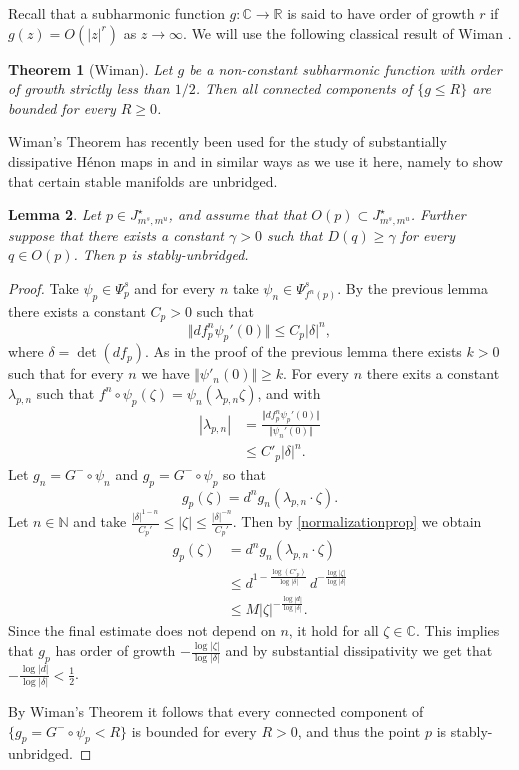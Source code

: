 \documentclass[10pt,a4paper]{article}
\newtheorem{theorem}{Theorem}[section]
\newtheorem{lemma}[theorem]{Lemma}
\begin{document}
Recall that a subharmonic function $g:\mathbb C\rightarrow \mathbb R$ is said to have order of growth $r$ if $g(z)=O(|z|^r)$ as $z\to\infty$. We will use the following classical result of Wiman \cite{Wi}.

\begin{theorem}[Wiman]
Let $g$ be a non-constant subharmonic function with order of growth strictly less than $1/2$. Then all connected components of $\{g\leq R\}$ are bounded for every $R\geq 0$.
\end{theorem}

Wiman's Theorem has recently been used for the study of substantially dissipative H\'enon maps in \cite{DL} and \cite{LP} in similar ways as we use it here, namely to show that certain stable manifolds are unbridged.

\begin{lemma}
\label{boundedangles}
Let $p\in J^\star_{m^s,m^u}$, and assume that that $O(p)\subset J^\star_{m^s,m^u}$. Further suppose that there exists a constant $\gamma>0$ such that $D(q)\geq \gamma$ for every $q\in O(p)$. Then $p$ is stably-unbridged.
\end{lemma}
\begin{proof}
Take $\psi_p\in\Psi^s_p$ and for every $n$ take $\psi_n\in\Psi^s_{f^n(p)}$. By the previous lemma there exists a constant $C_p>0$ such that
\[
\Vert df^n_p\psi_p'(0)\Vert\leq C_p|\delta|^n,
\]
where $\delta=\det(df_p)$. As in the proof of the previous lemma there exists $k>0$ such that for every $n$ we have $\Vert \psi'_n(0)\Vert\geq k$. For every $n$ there exits a constant $\lambda_{p,n}$ such that $f^n\circ \psi_p(\zeta)=\psi_n(\lambda_{p,n}\zeta)$, and with
\begin{align*}
|\lambda_{p,n}|&=\frac{\Vert df^n_p\psi_p'(0)\Vert}{\Vert \psi_n'(0)\Vert}\\
&\leq C'_p|\delta|^n.
\end{align*}
Let $g_n=G^-\circ\psi_n$ and $g_p=G^-\circ\psi_p$ so that
\[
g_p(\zeta)=d^ng_n(\lambda_{p,n}\cdot \zeta).
\]
Let $n\in\mathbb N$ and take $\frac{|\delta|^{1-n}}{C_p'}\leq|\zeta|\leq \frac{|\delta|^{-n}}{C_p'}$. Then by \eqref{normalizationprop} we obtain
\begin{align*}
g_p(\zeta)&=d^ng_n(\lambda_{p,n}\cdot \zeta)\\
&\leq d^{1-\frac{\log(C'_p)}{\log|\delta|}}\,d^{-\frac{\log|\zeta|}{\log|\delta|}}\\
&\leq M|\zeta|^{-\frac{\log|d|}{\log|\delta|}}.
\end{align*}
Since the final estimate does not depend on $n$, it hold for all $\zeta \in \mathbb C$. This implies that $g_p$ has order of growth $-\frac{\log|\zeta|}{\log|\delta|}$ and by substantial dissipativity we get that $-\frac{\log|d|}{\log|\delta|}<\frac{1}{2}$.

By Wiman's Theorem it follows that every connected component of $\{g_p=G^-\circ\psi_p<R\}$ is bounded for every $R>0$, and thus the point $p$ is stably-unbridged.
\end{proof}
\end{document}
